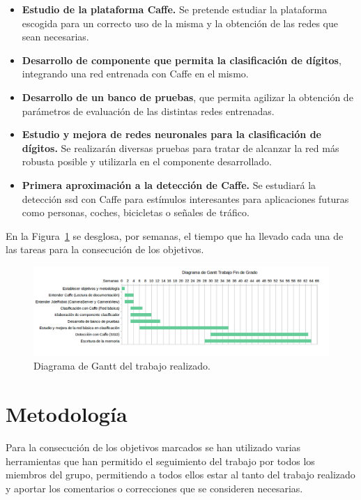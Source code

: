 \begin{itemize}
	\item \textbf{Estudio de la plataforma Caffe.} Se pretende estudiar la plataforma escogida para un correcto uso de la misma y la obtención de las redes que sean necesarias.
	\item \textbf{Desarrollo de componente que permita la clasificación de dígitos}, integrando una red entrenada con Caffe en el mismo.
	\item \textbf{Desarrollo de un banco de pruebas}, que permita agilizar la obtención de parámetros de evaluación de las distintas redes entrenadas.
	\item \textbf{Estudio y mejora de redes neuronales para la clasificación de dígitos.} Se realizarán diversas pruebas para tratar de alcanzar la red más robusta posible y utilizarla en el componente desarrollado.
	\item \textbf{Primera aproximación a la detección de Caffe.} Se estudiará la detección \acrfull{ssd} con Caffe para estímulos interesantes para aplicaciones futuras como personas, coches, bicicletas o señales de tráfico.
\end{itemize}

En la Figura~\ref{fig.diagrama} se desglosa, por semanas, el tiempo que ha llevado cada una de las tareas para la consecución de los objetivos.

\begin{figure}[H]
	\begin{center}
		\includegraphics[width=1\textwidth]{figures/diagrama}
		\caption{Diagrama de Gantt del trabajo realizado.}
		\label{fig.diagrama}
	\end{center}
\end{figure}

\section{Metodología}
Para la consecución de los objetivos marcados se han utilizado varias herramientas que han permitido el seguimiento del trabajo por todos los miembros del grupo, permitiendo a todos ellos estar al tanto del trabajo realizado y aportar los comentarios o correcciones que se consideren necesarias.\\

